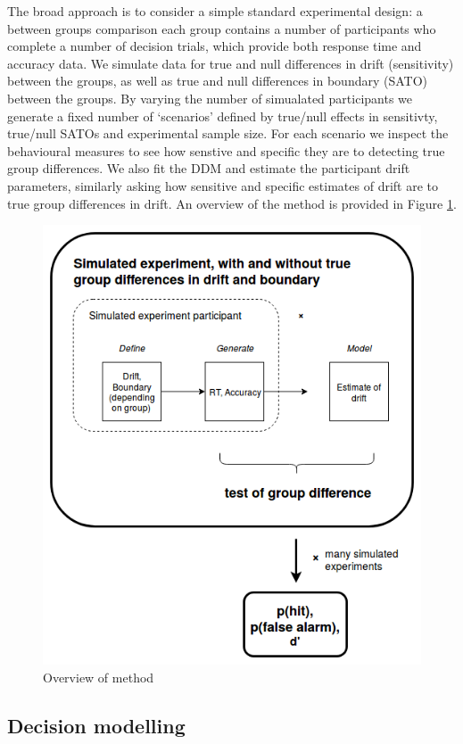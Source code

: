 \documentclass[floatsintext,doc]{apa6}
\theoremstyle{definition}
\theoremstyle{definition}
\theoremstyle{definition}
\theoremstyle{remark}
\begin{document}
The broad approach is to consider a simple standard experimental design:
a between groups comparison each group contains a number of participants
who complete a number of decision trials, which provide both response
time and accuracy data. We simulate data for true and null differences
in drift (sensitivity) between the groups, as well as true and null
differences in boundary (SATO) between the groups. By varying the number
of simualated participants we generate a fixed number of `scenarios'
defined by true/null effects in sensitivty, true/null SATOs and
experimental sample size. For each scenario we inspect the behavioural
measures to see how senstive and specific they are to detecting true
group differences. We also fit the DDM and estimate the participant
drift parameters, similarly asking how sensitive and specific estimates
of drift are to true group differences in drift. An overview of the
method is provided in Figure \ref{fig:DDMprocess}.

\begin{figure}

{\centering \includegraphics[width=0.75\linewidth]{figs/DDM_process_less} 

}

\caption{Overview of method}\label{fig:DDMprocess}
\end{figure}

\subsection{Decision modelling}\label{decision-modelling-1}
\end{document}

